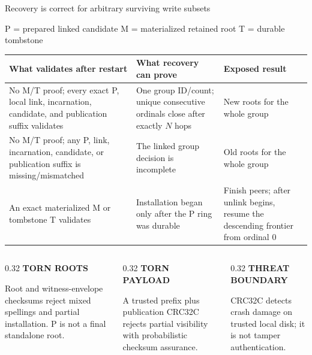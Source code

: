 \documentclass[aspectratio=169,10pt]{beamer}
\newcommand{\eyebrow}[1]{\textcolor{Accent}{\bfseries\scriptsize\MakeUppercase{#1}}}
\begin{document}
\begin{frame}[t]{Recovery is correct for arbitrary surviving write subsets}
  \vspace{0cm}
  {\centering\scriptsize P = prepared linked candidate \quad M = materialized retained root \quad T = durable tombstone\par}

  \vspace{0.08cm}
  \scriptsize
  \renewcommand{\arraystretch}{1.2}
  \begin{tabularx}{\textwidth}{>{\raggedright\arraybackslash}p{3.6cm} >{\raggedright\arraybackslash}p{4.55cm} X}
    \toprule
    \textbf{What validates after restart} & \textbf{What recovery can prove} & \textbf{Exposed result} \\
    \midrule
    No M/T proof; every exact P, local link, incarnation, candidate, and publication suffix validates & One group ID/count; unique consecutive ordinals close after exactly $N$ hops & New roots for the whole group \\
    No M/T proof; any P, link, incarnation, candidate, or publication suffix is missing/mismatched & The linked group decision is incomplete & Old roots for the whole group \\
    An exact materialized M or tombstone T validates & Installation began only after the P ring was durable & Finish peers; after unlink begins, resume the descending frontier from ordinal 0 \\
    \bottomrule
  \end{tabularx}

  \vspace{0.22cm}
  \begin{columns}[T,onlytextwidth]
    \begin{column}{0.32\textwidth}
      \eyebrow{Torn roots}\par\smallskip
      \scriptsize Root and witness-envelope checksums reject mixed spellings and partial installation. P is not a final standalone root.
    \end{column}
    \begin{column}{0.32\textwidth}
      \eyebrow{Torn payload}\par\smallskip
      \scriptsize A trusted prefix plus publication CRC32C rejects partial visibility with probabilistic checksum assurance.
    \end{column}
    \begin{column}{0.32\textwidth}
      \eyebrow{Threat boundary}\par\smallskip
      \scriptsize CRC32C detects crash damage on trusted local disk; it is not tamper authentication.
    \end{column}
  \end{columns}


\end{frame}
\end{document}
